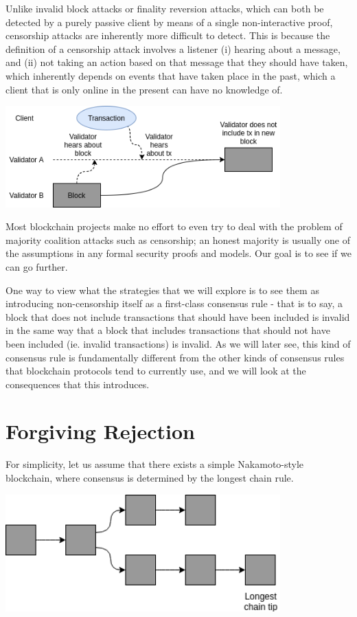 \documentclass[12pt]{article}
\begin{document}
Unlike invalid block attacks or finality reversion attacks, which can both be detected by a purely passive client by means of a single non-interactive proof, censorship attacks are inherently more difficult to detect. This is because the definition of a censorship attack involves a listener (i) hearing about a message, and (ii) not taking an action based on that message that they should have taken, which inherently depends on events that have taken place in the past, which a client that is only online in the present can have no knowledge of.

\includegraphics[width=400px]{Censorship1.png}

Most blockchain projects make no effort to even try to deal with the problem of majority coalition attacks such as censorship; an honest majority is usually one of the assumptions in any formal security proofs and models. Our goal is to see if we can go further.

One way to view what the strategies that we will explore is to see them as introducing non-censorship itself as a first-class consensus rule - that is to say, a block that does not include transactions that should have been included is invalid in the same way that a block that includes transactions that should not have been included (ie. invalid transactions) is invalid. As we will later see, this kind of consensus rule is fundamentally different from the other kinds of consensus rules that blockchain protocols tend to currently use, and we will look at the consequences that this introduces.

\section{Forgiving Rejection}

For simplicity, let us assume that there exists a simple Nakamoto-style blockchain, where consensus is determined by the longest chain rule.

\includegraphics[width=400px]{Censorship2.png}
\end{document}
